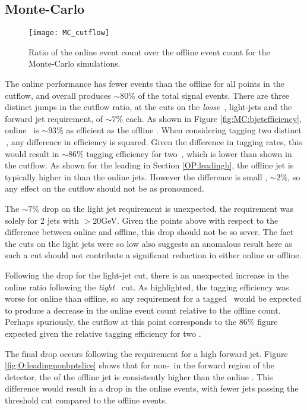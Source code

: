     \subsection{Monte-Carlo}
        \begin{figure}[h]
            \centering
            \texttt{[image: MC\_cutflow]}
            \caption[\VBFHBB\ Cutflow ratio for Monte-Carlo simulation]{Ratio of the online event count over the offline event count for the Monte-Carlo simulations.}
            \label{f:cutflowMC}
        \end{figure}

    The online performance has fewer events than the offline for all points in the cutflow, and overall produces $\sim80\%$ of the total signal events. There are three distinct jumps in the cutflow ratio, at the cuts on the \textit{loose} \bjets\,, light-jets and the forward jet requirement, of $\sim7\%$ each. As shown in Figure \ref{fig:MC:bjetefficiency}, online \btag\, is $\sim93\%$ as efficient as the offline \btag. When considering tagging two distinct \bjets\,, any difference in efficiency is squared. Given the difference in tagging rates, this would result in $\sim86\%$ tagging efficiency for two \bjets\,, which is lower than shown in the cutflow. As shown for the leading \bjet in Section \ref{OP:leadingb}, the offline jet is typically higher in \pt than the online jets. However the difference is small , $\sim2\%$, so any effect on the cutflow should not be as pronounced.

    The $\sim7\%$ drop on the light jet requirement is unexpected, the requirement was solely for 2 jets with \pt$>20$GeV. Given the points above with respect to the \pt difference between online and offline, this drop should not be so sever. The fact the \pt cuts on the light jets were so low also suggests an anomalous result here as such a cut should not contribute a significant reduction in either online or offline.

    Following the drop for the light-jet cut, there is an unexpected increase in the online ratio following the \textit{tight} \btagging\, cut. As highlighted, the tagging efficiency was worse for online than offline, so any requirement for a tagged \bjet\, would be expected to produce a decrease in the online event count relative to the offline count. Perhaps spuriously, the cutflow at this point corresponds to the $86\%$ figure expected given the relative tagging efficiency for two \bjets.

    The final drop occurs following the requirement for a high \pt forward jet. Figure \ref{fig:O:leadingnonbptslice} shows that for non-\bjets\, in the forward region of the detector, the \pt of the offline jet is consistently higher than the online \pt. This difference would result in a drop in the online events, with fewer jets passing the threshold \pt cut compared to the offline events.

